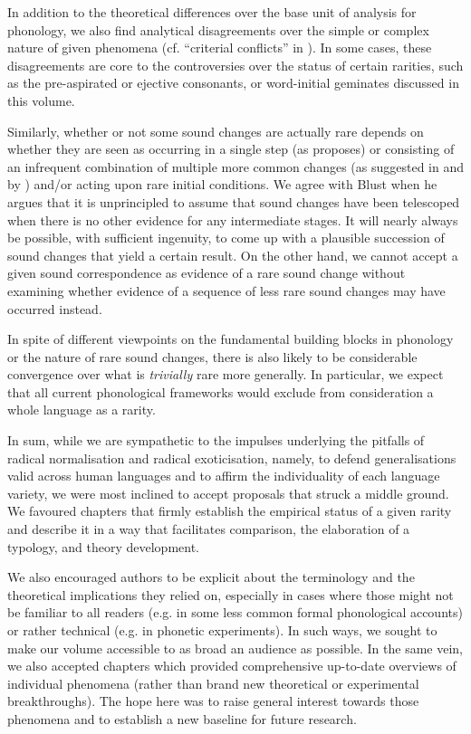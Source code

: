 \documentclass[output=paper]{langscibook}
\begin{document}
In addition to the theoretical differences over the base unit of analysis for phonology, we also find analytical disagreements over the simple or complex nature of given phenomena (cf. “criterial conflicts” in \citealt{Round2023}). In some cases, these disagreements are core to the controversies over the status of certain rarities, such as the pre-aspirated or ejective consonants, or word-initial geminates discussed in this volume. 

Similarly, whether or not some sound changes are actually rare depends on whether they are seen as occurring in a single step (as  proposes) or consisting of an infrequent combination of multiple more common changes (as suggested in  and by ) and/or acting upon rare initial conditions. We agree with Blust when he argues that it is unprincipled to assume that sound changes have been telescoped when there is no other evidence for any intermediate stages. It will nearly always be possible, with sufficient ingenuity, to come up with a plausible succession of sound changes that yield a certain result. On the other hand, we cannot accept a given sound correspondence as evidence of a rare sound change without examining whether evidence of a sequence of less rare sound changes may have occurred instead.

In spite of different viewpoints on the fundamental building blocks in phonology or the nature of rare sound changes, there is also likely to be considerable convergence over what is \textit{trivially} rare more generally. In particular, we expect that all current phonological frameworks would exclude from consideration a whole language as a rarity.

In sum, while we are sympathetic to the impulses underlying the pitfalls of radical normalisation and radical exoticisation, namely, to defend generalisations valid across human languages and to affirm the individuality of each language variety, we were most inclined to accept proposals that struck a middle ground. We favoured chapters that firmly establish the empirical status of a given rarity and describe it in a way that facilitates comparison, the elaboration of a typology, and theory development. 

We also encouraged authors to be explicit about the terminology and the theoretical implications they relied on, especially in cases where those might not be familiar to all readers (e.g. in some less common formal phonological accounts) or rather technical (e.g. in phonetic experiments). In such ways, we sought to make our volume accessible to as broad an audience as possible. In the same vein, we also accepted chapters which provided comprehensive up-to-date overviews of individual phenomena (rather than brand new theoretical or experimental breakthroughs). The hope here was to raise general interest towards those phenomena and to establish a new baseline for future research.
\end{document}
